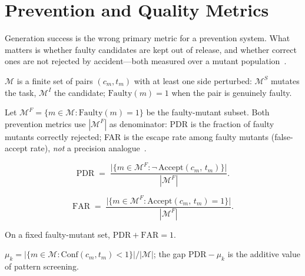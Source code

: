 \section{Prevention and Quality Metrics}
\label{sec:form:metrics}

Generation success is the wrong primary metric for a prevention system.
What matters is whether faulty candidates are kept out of release, and whether
correct ones are not rejected by accident---both measured over a mutant
population~\citep{demillo1978mutation,ammann2016testing}.

\begin{definition}
\label{def:mutants}
$\mathcal{M}$ is a finite set of pairs $(c_m, t_m)$ with at least one side
perturbed: $\mathcal{M}^S$ mutates the task, $\mathcal{M}^I$ the candidate;
$\mathrm{Faulty}(m)=1$ when the pair is genuinely faulty.
\end{definition}

Let $\mathcal{M}^F = \{m \in \mathcal{M} : \mathrm{Faulty}(m)=1\}$ be the
faulty-mutant subset.
Both prevention metrics use $|\mathcal{M}^F|$ as denominator:
PDR is the fraction of faulty mutants correctly rejected;
FAR is the escape rate among faulty mutants (false-accept rate),
\emph{not} a precision analogue~\citep{okun2013sate4}.

\begin{definition}
\label{def:pdr}
\[
  \mathrm{PDR}
  \;=\;
  \frac{\bigl|\bigl\{m \in \mathcal{M}^F : \neg\,\mathrm{Accept}(c_m,\,t_m)\bigr\}\bigr|}
       {|\mathcal{M}^F|}.
\]
\end{definition}

\begin{definition}
\label{def:far}
\[
  \mathrm{FAR}
  \;=\;
  \frac{\bigl|\bigl\{m \in \mathcal{M}^F :
      \mathrm{Accept}(c_m,\,t_m) = 1
    \bigr\}\bigr|}
       {|\mathcal{M}^F|}.
\]
\end{definition}

On a fixed faulty-mutant set, $\mathrm{PDR}+\mathrm{FAR}=1$.

\begin{definition}
\label{def:mkr}
$\mu_k = |\{m\in\mathcal{M}:\mathrm{Conf}(c_m,t_m)<1\}|/|\mathcal{M}|$;
the gap $\mathrm{PDR}-\mu_k$ is the additive value of pattern screening.
\end{definition}

